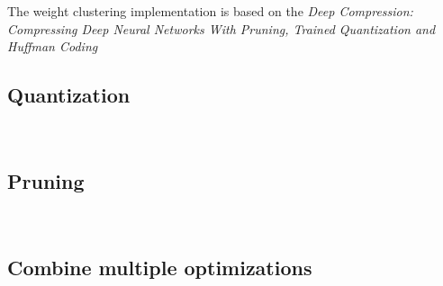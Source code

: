 The weight clustering implementation is based on the \textit{Deep Compression:
Compressing Deep Neural Networks With Pruning, Trained Quantization and Huffman
Coding}~\cite{han2015deep}~\cite{tfmot:clustering}

\subsection{Quantization}
~\cite{tfmot:quantization_post_training}
~\cite{tfmot:quantization_training}

\subsection{Pruning}
~\cite{tfmot:pruning}

\subsection{Combine multiple optimizations}